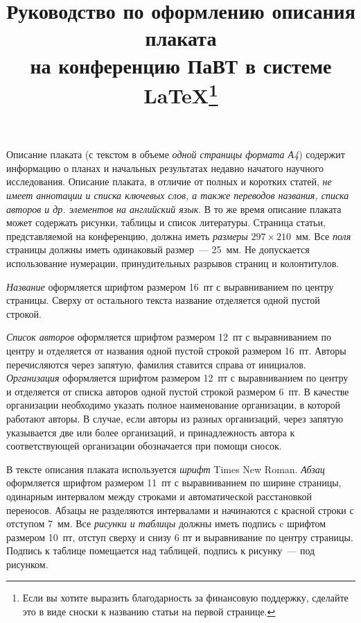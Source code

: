 \documentclass[11pt, oneside, a4paper]{article}
\begin{document}

\title{Руководство по оформлению описания плаката \\на конференцию ПаВТ
в системе \LaTeX\footnote{Если вы хотите выразить благодарность за
финансовую поддержку, сделайте это в виде сноски к названию статьи на
первой странице.}}


Описание плаката (с текстом в объеме \emph{одной страницы формата А4}) содержит информацию о планах и начальных результатах недавно начатого научного исследования. Описание плаката, в отличие от полных и коротких статей, \emph{не имеет аннотации и списка ключевых слов, а также переводов названия, списка авторов и др. элементов на английский язык}. В то же время описание плаката может содержать рисунки, таблицы и список литературы. Страница статьи, представляемой на конференцию, должна иметь \emph{размеры}
$297 \times 210$~мм. Все \emph{поля} страницы должны иметь одинаковый размер~--- 25~мм. Не допускается использование нумерации, принудительных разрывов страниц и колонтитулов.

\emph{Название} оформляется шрифтом размером 16~пт с выравниванием по центру страницы. Сверху от остального текста название отделяется одной пустой строкой. 

\emph{Список авторов} оформляется шрифтом размером 12~пт с выравниванием по центру и отделяется от названия одной пустой строкой размером 16~пт. Авторы перечисляются через запятую, фамилия ставится справа от инициалов. \emph{Организация} оформляется шрифтом размером 12~пт с выравниванием по центру и отделяется от списка авторов одной пустой строкой размером 6~пт. В качестве организации необходимо указать полное наименование организации, в которой работают авторы. В случае, если авторы из разных организаций, через запятую указывается две или более организаций, и принадлежность автора к соответствующей организации обозначается при помощи сносок.

В тексте описания плаката используется \emph{шрифт} Times New Roman. \emph{Абзац} оформляется шрифтом размером 11~пт с выравниванием по ширине страницы, одинарным интервалом между строками и автоматической расстановкой переносов. Абзацы не разделяются интервалами и начинаются с красной строки с отступом 7~мм. Все \emph{рисунки и таблицы} должны иметь подпись c шрифтом размером 10~пт, отступ сверху и снизу 6 пт и выравнивание по центру страницы. Подпись к таблице помещается над таблицей, подпись к рисунку~--- под рисунком. 
\end{document}
